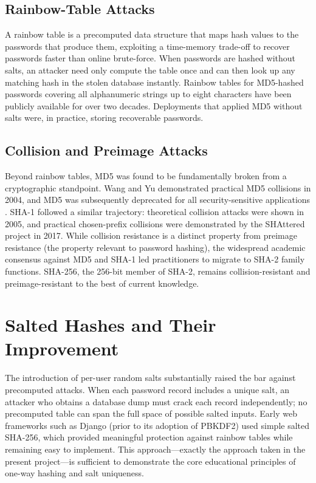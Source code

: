 \subsection{Rainbow-Table Attacks}
\label{sec:lit_rainbow}

A rainbow table is a precomputed data structure that maps hash values to the passwords that produce them, exploiting a time-memory trade-off to recover passwords faster than online brute-force. When passwords are hashed without salts, an attacker need only compute the table once and can then look up any matching hash in the stolen database instantly. Rainbow tables for MD5-hashed passwords covering all alphanumeric strings up to eight characters have been publicly available for over two decades. Deployments that applied MD5 without salts were, in practice, storing recoverable passwords.

\subsection{Collision and Preimage Attacks}
\label{sec:lit_collision}

Beyond rainbow tables, MD5 was found to be fundamentally broken from a cryptographic standpoint. Wang and Yu demonstrated practical MD5 collisions in 2004, and MD5 was subsequently deprecated for all security-sensitive applications \cite{kelsey2005}. SHA-1 followed a similar trajectory: theoretical collision attacks were shown in 2005, and practical chosen-prefix collisions were demonstrated by the SHAttered project in 2017. While collision resistance is a distinct property from preimage resistance (the property relevant to password hashing), the widespread academic consensus against MD5 and SHA-1 led practitioners to migrate to SHA-2 family functions. SHA-256, the 256-bit member of SHA-2, remains collision-resistant and preimage-resistant to the best of current knowledge.

\section{Salted Hashes and Their Improvement}
\label{sec:lit_salted}

The introduction of per-user random salts substantially raised the bar against precomputed attacks. When each password record includes a unique salt, an attacker who obtains a database dump must crack each record independently; no precomputed table can span the full space of possible salted inputs. Early web frameworks such as Django (prior to its adoption of PBKDF2) used simple salted SHA-256, which provided meaningful protection against rainbow tables while remaining easy to implement. This approach---exactly the approach taken in the present project---is sufficient to demonstrate the core educational principles of one-way hashing and salt uniqueness.

